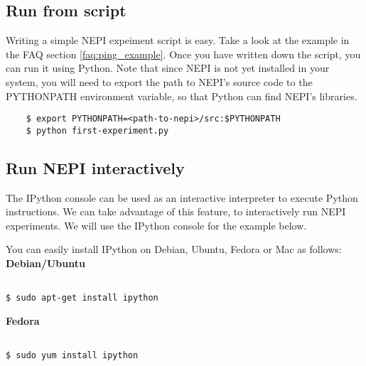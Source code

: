 \subsection{Run from script}

Writing a simple NEPI expeiment script is easy.
Take a look at the example in the FAQ section \ref{faq:ping_example}.
Once you have written down the script, you can run it using
Python. Note that since NEPI is not yet installed in your system,
you will need to export the path to NEPI's source code to 
the PYTHONPATH environment variable, so that Python can find
NEPI's libraries.

\begingroup
    \fontsize{10pt}{12pt}\selectfont

\begin{verbatim}
    $ export PYTHONPATH=<path-to-nepi>/src:$PYTHONPATH
    $ python first-experiment.py 
\end{verbatim}

\endgroup

\subsection{Run NEPI interactively}

The IPython console can be used as an interactive interpreter to 
execute Python instructions. We can take advantage of this feature, 
to interactively run NEPI experiments. 
We will use the IPython console for the example below. 

You can easily install IPython on Debian, Ubuntu, Fedora or Mac as follows:\\

\textbf{Debian/Ubuntu}

\begingroup
    \fontsize{10pt}{12pt}\selectfont

\begin{verbatim}

$ sudo apt-get install ipython

\end{verbatim}

\endgroup

\textbf{Fedora}\\

\begingroup
    \fontsize{10pt}{12pt}\selectfont

\begin{verbatim}

$ sudo yum install ipython

\end{verbatim}

